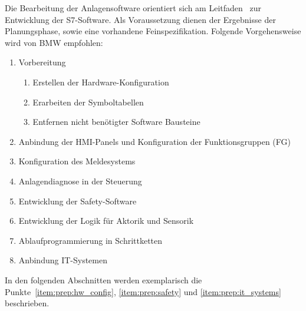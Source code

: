 Die Bearbeitung der Anlagensoftware orientiert sich am Leitfaden~ zur Entwicklung der S7-Software. Als Voraussetzung dienen der Ergebnisse der Planungsphase, sowie eine vorhandene Feinspezifikation. Folgende Vorgehensweise wird von BMW empfohlen:
\begin{enumerate}
    \itemsep 0.05em
    \item Vorbereitung
    \begin{enumerate}
        \itemsep 0.05em
        \item {Erstellen der Hardware-Konfiguration}\label{item:prep:hw_config}
        \item Erarbeiten der Symboltabellen
        \item Entfernen nicht benötigter Software Bausteine
    \end{enumerate} 
    \item Anbindung der HMI-Panels und Konfiguration der Funktionsgruppen (FG)
    \item Konfiguration des Meldesystems
    \item Anlagendiagnose in der Steuerung
    \item {Entwicklung der Safety-Software}\label{item:prep:safety}
    \item Entwicklung der Logik für Aktorik und Sensorik
    \item Ablaufprogrammierung in Schrittketten
    \item Anbindung IT-Systemen\label{item:prep:it_systems}
\end{enumerate}

In den folgenden Abschnitten werden exemplarisch die Punkte~\ref{item:prep:hw_config}, \ref{item:prep:safety} und \ref{item:prep:it_systems} beschrieben. 

